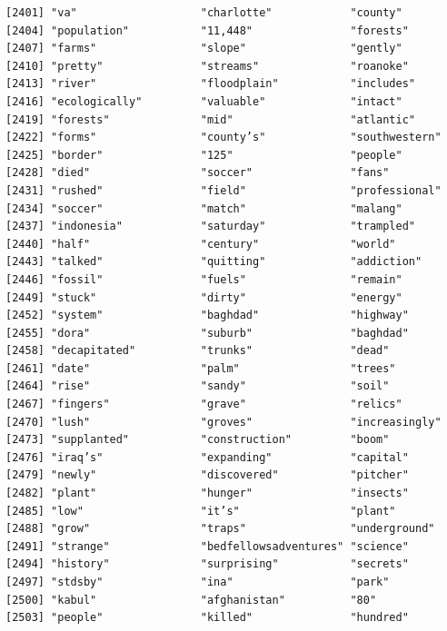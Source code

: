 \documentclass[
  letterpaper,
  DIV=11,
  numbers=noendperiod]{scrartcl}
\begin{document}
\begin{verbatim}
[2401] "va"                   "charlotte"            "county"              
[2404] "population"           "11,448"               "forests"             
[2407] "farms"                "slope"                "gently"              
[2410] "pretty"               "streams"              "roanoke"             
[2413] "river"                "floodplain"           "includes"            
[2416] "ecologically"         "valuable"             "intact"              
[2419] "forests"              "mid"                  "atlantic"            
[2422] "forms"                "county’s"             "southwestern"        
[2425] "border"               "125"                  "people"              
[2428] "died"                 "soccer"               "fans"                
[2431] "rushed"               "field"                "professional"        
[2434] "soccer"               "match"                "malang"              
[2437] "indonesia"            "saturday"             "trampled"            
[2440] "half"                 "century"              "world"               
[2443] "talked"               "quitting"             "addiction"           
[2446] "fossil"               "fuels"                "remain"              
[2449] "stuck"                "dirty"                "energy"              
[2452] "system"               "baghdad"              "highway"             
[2455] "dora"                 "suburb"               "baghdad"             
[2458] "decapitated"          "trunks"               "dead"                
[2461] "date"                 "palm"                 "trees"               
[2464] "rise"                 "sandy"                "soil"                
[2467] "fingers"              "grave"                "relics"              
[2470] "lush"                 "groves"               "increasingly"        
[2473] "supplanted"           "construction"         "boom"                
[2476] "iraq’s"               "expanding"            "capital"             
[2479] "newly"                "discovered"           "pitcher"             
[2482] "plant"                "hunger"               "insects"             
[2485] "low"                  "it’s"                 "plant"               
[2488] "grow"                 "traps"                "underground"         
[2491] "strange"              "bedfellowsadventures" "science"             
[2494] "history"              "surprising"           "secrets"             
[2497] "stdsby"               "ina"                  "park"                
[2500] "kabul"                "afghanistan"          "80"                  
[2503] "people"               "killed"               "hundred"             

\end{verbatim}
\end{document}
